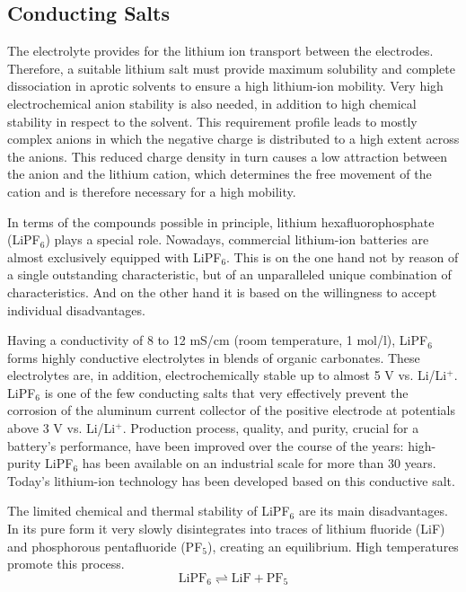 \subsection{Conducting Salts}
\label{sec:conducting-salts}
The electrolyte provides for the lithium ion transport between the electrodes. Therefore, a suitable lithium salt must provide maximum solubility and complete dissociation in aprotic solvents to ensure a high lithium-ion mobility. Very high electrochemical anion stability is also needed, in addition to high chemical stability in respect to the solvent. This requirement profile leads to mostly complex anions in which the negative charge is distributed to a high extent across the anions. This reduced charge density in turn causes a low attraction between the anion and the lithium cation, which determines the free movement of the cation and is therefore necessary for a high mobility.

In terms of the compounds possible in principle, lithium hexafluorophosphate (LiPF$_6$) plays a special role. Nowadays, commercial lithium-ion batteries are almost exclusively equipped with LiPF$_6$. This is on the one hand not by reason of a single outstanding characteristic, but of an unparalleled unique combination of characteristics. And on the other hand it is based on the willingness to accept individual disadvantages.

Having a conductivity of 8 to 12 mS/cm (room temperature, 1 mol/l), LiPF$_6$ forms highly conductive electrolytes in blends of organic carbonates. These electrolytes are, in addition, electrochemically stable up to almost 5 V vs. Li/Li$^+$. LiPF$_6$ is one of the few conducting salts that very effectively prevent the corrosion of the aluminum current collector of the positive electrode at potentials above 3 V vs. Li/Li$^+$. Production process, quality, and purity, crucial for a battery's performance, have been improved over the course of the years: high-purity LiPF$_6$ has been available on an industrial scale for more than 30 years. Today's lithium-ion technology has been developed based on this conductive salt.

The limited chemical and thermal stability of LiPF$_6$ are its main disadvantages. In its pure form it very slowly disintegrates into traces of lithium fluoride (LiF) and phosphorous pentafluoride (PF$_5$), creating an equilibrium. High temperatures promote this process.
\begin{equation}
    \label{eq:lipf6-dissociation}
    \text{LiPF}_6 \rightleftharpoons \text{LiF} + \text{PF}_5
\end{equation}

